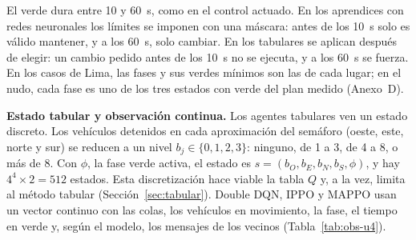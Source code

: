 El verde dura entre 10 y 60~s, como en el control actuado. En los
aprendices con redes neuronales los límites se imponen con una máscara:
antes de los 10~s solo es válido mantener, y a los 60~s, solo cambiar.
En los tabulares se aplican después de elegir: un cambio pedido antes
de los 10~s no se ejecuta, y a los 60~s se fuerza. En los casos de Lima,
las fases y sus verdes mínimos son las de cada lugar; en el nudo, cada
fase es uno de los tres estados con verde del plan medido (Anexo~D).

\noindent\textbf{Estado tabular y observación continua.} Los agentes
tabulares ven un estado discreto. Los vehículos detenidos
en cada aproximación del semáforo (oeste, este, norte y sur) se reducen
a un nivel $b_j \in \{0, 1, 2, 3\}$: ninguno, de 1 a 3, de 4 a 8, o más
de 8. Con $\phi$, la fase verde activa, el estado es
$s = (b_O, b_E, b_N, b_S, \phi)$, y hay $4^4 \times 2 = 512$ estados.
Esta discretización hace viable la tabla $Q$ y, a la vez, limita al
método tabular (Sección~\ref{sec:tabular}). Double DQN, IPPO y MAPPO usan un
vector continuo con las colas, los vehículos en movimiento, la fase, el
tiempo en verde y, según el modelo, los mensajes de los vecinos
(Tabla~\ref{tab:obs-u4}).

